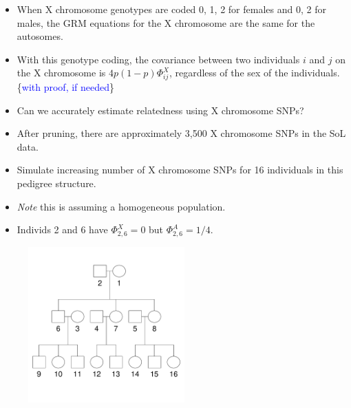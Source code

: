 \documentclass{beamer}
\begin{document}
\begin{frame}
\begin{itemize}
\item When X chromosome genotypes are coded 0, 1, 2 for females and 0, 2 for males, the GRM equations for the X chromosome are the same for the autosomes.
\item With this genotype coding, the covariance between two individuals $i$ and $j$ on the X chromosome is $4p(1-p)\Phi_{ij}^X$, regardless of the sex of the individuals. \{\textcolor{blue}{with proof, if needed}\}
\end{itemize}
\end{frame}

\begin{frame}
\begin{itemize}
\item Can we accurately estimate relatedness using X chromosome SNPs? 
\item After pruning, there are approximately 3,500 X chromosome SNPs in the SoL data.
\end{itemize}
\end{frame}

\begin{frame}
\begin{itemize}
\item Simulate increasing number of X chromosome SNPs for 16 individuals in this pedigree structure.
\item \textit{Note} this is assuming a homogeneous population.
\item Individs 2 and 6 have $\Phi_{2,6}^X=0$ but $\Phi_{2,6}^A=1/4$.
\end{itemize}
\centering
\begin{figure}
\includegraphics[height=6cm]{../pedigree_16individs.pdf}
\end{figure}
\end{frame}
\end{document}
